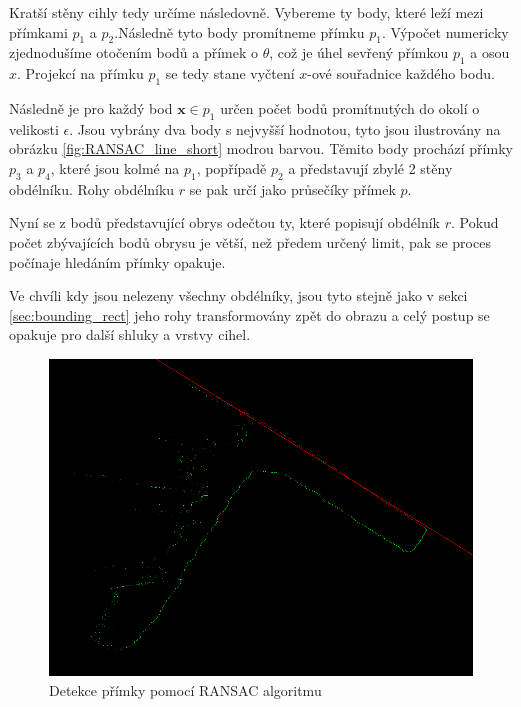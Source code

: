 \documentclass[twoside]{ctuthesis}
\begin{document}
Kratší stěny cihly tedy určíme následovně. Vybereme ty body, které leží mezi přímkami $p_1$ a $p_2$.Následně tyto body promítneme přímku $p_1$. Výpočet numericky zjednodušíme otočením bodů a přímek o $\theta$, což je úhel sevřený přímkou $p_1$ a osou $x$. Projekcí na přímku $p_1$ se tedy stane vyčtení $x$-ové souřadnice každého bodu.

Následně je pro každý bod $\mathbf{x} \in p_1$ určen počet bodů promítnutých do okolí o velikosti $\epsilon$. Jsou vybrány dva body s nejvyšší hodnotou, tyto jsou ilustrovány na obrázku \ref{fig:RANSAC_line_short} modrou barvou. Těmito body prochází přímky $p_3$ a $p_4$, které jsou kolmé na $p_1$, popřípadě $p_2$ a představují zbylé 2 stěny obdélníku. Rohy obdélníku $r$ se pak určí jako průsečíky přímek $p$.

Nyní se z bodů představující obrys odečtou ty, které popisují obdélník $r$. Pokud počet zbývajících bodů obrysu je větší, než předem určený limit, pak se proces počínaje hledáním přímky opakuje.

Ve chvíli kdy jsou nelezeny všechny obdélníky, jsou tyto stejně jako v sekci \ref{sec:bounding_rect} jeho rohy transformovány zpět do obrazu a celý postup se opakuje pro další shluky a vrstvy cihel.




\begin{figure}
    \centering
    \includegraphics[width = \linewidth]{pictures/ransac_rect_fit1.png}
    \caption{Detekce přímky pomocí RANSAC algoritmu}
    \label{fig:RANSAC_line}
\end{figure}
\end{document}
